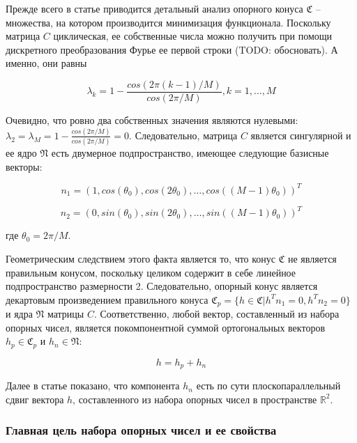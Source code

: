 \documentclass[a4paper, 12pt, titlepage]{article}
\theoremstyle{definition}
\theoremstyle{plain}
\theoremstyle{plain}
\begin{document}
Прежде всего в статье приводится детальный анализ опорного конуса $\mathfrak{C}$
-- множества, на котором производится минимизация функционала. Поскольку матрица
$C$ циклическая, ее собственные числа можно получить при помощи дискретного
преобразования Фурье ее первой строки (TODO: обосновать). А именно, они равны

\begin{equation}
\lambda_{k} = 1 - \frac{cos(2 \pi (k - 1) / M)}{cos(2 \pi / M)},
k = 1, \ldots, M
\end{equation}

Очевидно, что ровно два собственных значения являются нулевыми:
$\lambda_{2} = \lambda_{M} = 1 - \frac{cos(2 \pi / M)}{cos(2 \pi / M)} = 0$.
Следовательно, матрица $C$ является сингулярной и ее ядро $\mathfrak{N}$ есть
двумерное подпространство, имеющее следующие базисные векторы:

\begin{equation}
n_{1} = (1, cos(\theta_{0}), cos(2 \theta_{0}), \ldots,
cos((M - 1) \theta_{0}))^{T}
\end{equation}

\begin{equation}
n_{2} = (0, sin(\theta_{0}), sin(2 \theta_{0}), \ldots,
sin((M - 1) \theta_{0}))^{T}
\end{equation}

где $\theta_{0} = 2 \pi / M$.

Геометрическим следствием этого факта является то, что конус $\mathfrak{C}$ не
является правильным конусом, поскольку целиком содержит в себе линейное
подпространство размерности 2. Следовательно, опорный конус является декартовым
произведением правильного конуса
$\mathfrak{C}_{p} = \{h \in \mathfrak{C} | h^{T} n_{1} = 0, h^{T} n_{2} = 0\}$
и ядра $\mathfrak{N}$ матрицы $C$. Соответственно, любой вектор, составленный из
набора опорных чисел, является покомпонентной суммой ортогональных векторов
$h_{p} \in \mathfrak{C}_{p}$ и $h_{n} \in \mathfrak{N}$:

\begin{equation}
 h = h_{p} + h_{n}
\end{equation}

Далее в статье показано, что компонента $h_{n}$ есть по сути плоскопараллельный
сдвиг вектора $h$, составленного из набора опорных чисел в пространстве
$\mathbb{R}^{2}$.


\subsubsection{Главная цель набора опорных чисел и ее свойства}
\end{document}
